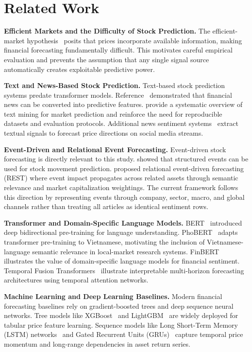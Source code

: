 \documentclass[runningheads]{llncs}
\begin{document}
\section{Related Work}
\label{secrelated}

\textbf{Efficient Markets and the Difficulty of Stock Prediction.}
The efficient-market hypothesis~\cite{fama1970efficient} posits that prices incorporate available information, making financial forecasting fundamentally difficult. This motivates careful empirical evaluation and prevents the assumption that any single signal source automatically creates exploitable predictive power.

\textbf{Text and News-Based Stock Prediction.}
Text-based stock prediction systems predate transformer models. Reference~\cite{schumaker2009azfin} demonstrated that financial news can be converted into predictive features. \cite{nassirtoussi2014survey} provide a systematic overview of text mining for market prediction and reinforce the need for reproducible datasets and evaluation protocols. Additional news sentiment systems~\cite{nguyen2015sentiment} extract textual signals to forecast price directions on social media streams.

\textbf{Event-Driven and Relational Event Forecasting.}
Event-driven stock forecasting is directly relevant to this study. \cite{ding2014event} showed that structured events can be used for stock movement prediction. \cite{xu2021rest} proposed relational event-driven forecasting (REST) where event impact propagates across related assets through semantic relevance and market capitalization weightings. The current framework follows this direction by representing events through company, sector, macro, and global channels rather than treating all articles as identical sentiment rows.

\textbf{Transformer and Domain-Specific Language Models.}
BERT~\cite{devlin2019bert} introduced deep bidirectional pre-training for language understanding. PhoBERT~\cite{nguyen2020phobert} adapts transformer pre-training to Vietnamese, motivating the inclusion of Vietnamese-language semantic relevance in local-market research systems. FinBERT~\cite{araci2019finbert} illustrates the value of domain-specific language models for financial sentiment. Temporal Fusion Transformers~\cite{lim2021tft} illustrate interpretable multi-horizon forecasting architectures using temporal attention networks.

\textbf{Machine Learning and Deep Learning Baselines.}
Modern financial forecasting baselines rely on gradient-boosted trees and deep sequence neural networks. Tree models like XGBoost~\cite{chen2016xgboost} and LightGBM~\cite{ke2017lightgbm} are widely deployed for tabular price feature learning. Sequence models like Long Short-Term Memory (LSTM) networks~\cite{hochreiter1997long} and Gated Recurrent Units (GRUs)~\cite{chung2014gru} capture temporal price momentum and long-range dependencies in asset return series.
\end{document}

